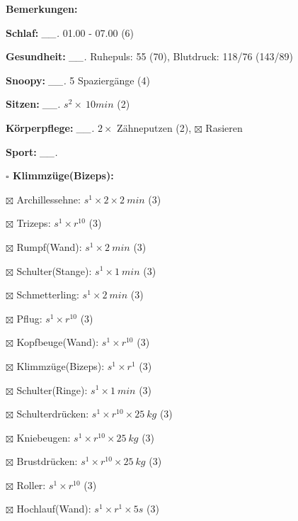 \documentclass[10pt,a4paper]{article}
\newcommand\prop[1] {{\color {alizarin} {\bf #1}}}             %
\newcommand\mand[1] {{\color {burntorange} {\bf #1}}}          %
\newcommand\topspace{\vskip -15pt \hskip 20pt}
\newcommand\n[1] { {\sl #1.} \hskip 5pt }
\begin{document}
\begin{mdframed}[style=daystyle]
  \begin{labeling}{{\mand {Bemerkungen:}}}
    \setlength\itemsep{-3pt}
  \item[{\mand {Schlaf:}}]        \n{\_\_} 01.00 - 07.00 (6)
  \item[{\mand {Gesundheit:}}]    \n{\_\_} Ruhepuls: 55 (70), Blutdruck: 118/76 (143/89)
  \item[{\mand {Snoopy:}}]        \n{\_\_} 5 Spaziergänge (4) 
  \item[{\mand {Sitzen:}}]        \n{\_\_} $s^2 \times\ 10 min$ (2)
  \item[{\mand {Körperpflege:}}]  \n{\_\_} $2 \times$ Zähneputzen (2), $\boxtimes$ Rasieren
  \item[{\mand {Sport:}}]         \n{\_\_}
    \topspace
    \begin{minipage}{0.75\textwidth}  
      \begin{labeling}{\prop {$\square$ {Klimmzüge(Bizeps):}}}
        \setlength\itemsep{-3pt}
      \item[$\boxtimes$ Archillessehne:]    $s^1 \times 2 \times 2\ min$ (3)
      \item[$\boxtimes$ Trizeps:]           $s^1 \times r^{10}$ (3)
      \item[$\boxtimes$ Rumpf(Wand):]       $s^1 \times 2\ min$ (3)
      \item[$\boxtimes$ Schulter(Stange):]  $s^1 \times 1\ min$ (3)
      \item[$\boxtimes$ Schmetterling:]     $s^1 \times 2\ min$ (3)
      \item[$\boxtimes$ Pflug:]             $s^1 \times r^{10}$ (3)
      \item[$\boxtimes$ Kopfbeuge(Wand):]   $s^1 \times r^{10}$ (3)
      \item[$\boxtimes$ Klimmzüge(Bizeps):] $s^1 \times r^1$ (3)
      \item[$\boxtimes$ Schulter(Ringe):]   $s^1 \times 1\ min$ (3)
      \item[$\boxtimes$ Schulterdrücken:]   $s^1 \times r^{10} \times 25\ kg$ (3)
      \item[$\boxtimes$ Kniebeugen:]        $s^1 \times r^{10} \times 25\ kg$ (3)
      \item[$\boxtimes$ Brustdrücken:]      $s^1 \times r^{10} \times 25\ kg$ (3)
      \item[$\boxtimes$ Roller:]            $s^1 \times r^{10}$ (3)
      \item[$\boxtimes$ Hochlauf(Wand):]    $s^1 \times r^{1} \times 5s$ (3)

\end{labeling}
\end{minipage}
\end{labeling}
\end{mdframed}
\end{document}

